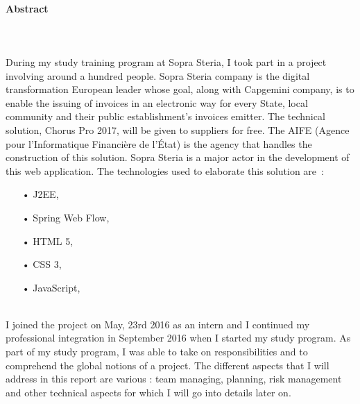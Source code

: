 \documentclass[12pt,a4paper]{article}
\begin{document}
\paragraph{Abstract}
~~\\\\
During my study training program at Sopra Steria, I took part in a project involving around a hundred people. Sopra Steria company is the digital transformation European leader whose goal, along with Capgemini company, is to enable the issuing of invoices in an electronic way for every State, local community and their public establishment’s invoices emitter. The technical solution, Chorus Pro 2017, will be given to suppliers for free. The AIFE (Agence pour l’Informatique Financière de l’État) is the agency that handles the construction of this solution. Sopra Steria is a major actor in the development of this web application. The technologies used to elaborate this solution are~:\\
\begin{itemize}
\item[•] \gls{J2EE},
\item[•] Spring Web Flow,
\item[•] HTML 5,
\item[•] CSS 3,
\item[•] JavaScript,
\end{itemize}
~~\\
 I joined the project on May, 23rd 2016 as an intern and I continued my professional integration in September 2016 when I started my study program. As part of my study program, I was able to take on responsibilities and to comprehend the global notions of a project. The different aspects that I will address in this report are various : team managing, planning, risk management and other technical aspects for which I will go into details later on. 
\newpage
\renewcommand{\contentsname}{Table des matières}
\tableofcontents
\newpage
\end{document}
